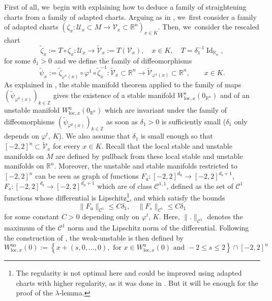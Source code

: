 \documentclass[JEP,XML,SOM,Unicode,NoEqCountersInSection,NoFloatCountersInSection,published]{cedram}
\newcommand{\loc}{\mathrm{loc}}
\newcommand{\rs}{\mathrm{s}}
\newcommand{\ru}{\mathrm{u}}
\newcommand{\ruo}{\mathrm{uo}}
\theoremstyle{definition}
\theoremstyle{plain}
\newcommand{\Ccal}{\mathcal{C}}
\newcommand{\R}{\mathbb{R}}
\newcommand{\Ucal}{\mathcal{U}}
\newcommand{\Vcal}{\mathcal{V}}
\newcommand{\Z}{\mathbb{Z}}
\DeclareMathOperator{\Id}{Id}
\begin{document}
\begin{appendix}
First of all, we~begin with explaining how to deduce a family of straightening charts from a family of adapted charts. Arguing as in \cite[p.\,36]{dyatlov}, we~first consider a family of adapted charts $\left(\zeta_x: \Ucal_x \subset M \to \Vcal_x \subset \R^n \right)_{x \in K}$. Then, we~consider the rescaled chart
\[
\widetilde{\zeta}_x:= T \circ \zeta_x: \Ucal_x \to \widetilde{ \Vcal}_{x}:= T\left(\Vcal_{x} \right), \quad x \in K, \quad T = \delta_1^{-1} \Id_{\R_n},
\]
for some $\delta_1 > 0$ and we define the family of diffeomorphisms
\[
\widetilde{\psi}_x:= \widetilde{\zeta}_{\varphi^1 (x)} \circ \varphi^1 \circ \widetilde{\zeta}_{x}^{-1}: \widetilde{\Vcal}_x \subset \R^n \to \widetilde{\Vcal}_{\varphi^1 (x)} \subset \R^n, \qquad x \in K.
\]
As explained in \cite[\S 3.4]{dyatlov}, the stable manifold theorem applied to the family of maps $(\widetilde{\psi}_{\varphi^k (x)})_{k \in \Z}$ gives the existence of a stable manifold $W_{\loc,x}^\rs (0_{\R^n})$ and of an unstable manifold $W_{\loc,x}^\ru (0_{\R^n})$ which are invariant under the family of diffeomorphisms $(\widetilde{\psi}_{\varphi^k (x)})_{k \in \Z}$ as soon as $\delta_1 > 0$ is sufficiently small ($\delta_1$ only depends on $\varphi^t$, $K$). We also assume that $\delta_1$ is small enough so that $[-2,2]^n \subset \widetilde{\Vcal}_x$ for every $x \in K$. Recall that the local stable and unstable manifolds on $M$ are defined by pullback from these local stable and unstable manifolds on $\R^n$.
Moreover, the unstable and stable manifolds restricted to $[-2,2]^n$ can be seen as graph of functions $F_\ru: [-2,2]^{d_\ru} \to [-2,2]^{d_\rs + 1}$, $F_s: [-2,2]^{d_\rs} \to [-2,2]^{d_\ru + 1}$ which are of class $\Ccal^{1,1}$, defined as the set of $\Ccal^1$ functions whose differential is Lipschitz\footnote{The regularity is not optimal here and could be improved using adapted charts with higher regularity, as it was done in \cite{dyatlov}. But it will be enough for the proof of the $\lambda$-lemma.}, and which satisfy the bounds
\begin{equation}\label{eq: bound Fu and Fs}
\| F_\ru \|_{\Ccal^{1}} \leq C \delta_1, \quad \| F_s \|_{\Ccal^{1}} \leq C \delta_1
\end{equation}
for some constant $C > 0$ depending only on $\varphi^t$, $K$. Here, $\|.\|_{\Ccal^{1}}$ denotes the maximum of the $\Ccal^1$ norm and the Lipschitz norm of the differential. Following the construction of \cite{dyatlov}, the weak-unstable is then defined by
\[
W_{\loc,x}^{\ruo} (0):= \left\{ x + (s,0,\dots, 0), \text{ for } x \in W_{\loc,x}^\ru (0) \text{ and } -2 \leq s \leq 2 \right\} \cap [-2,2]^n
\]
\end{appendix}
\end{document}
